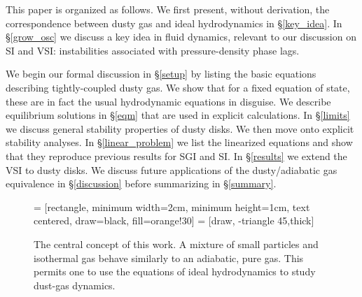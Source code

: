 \documentclass[iop, numberedappendix]{emulateapj}
\begin{document}
This paper is organized as follows. We first present, without
derivation, the correspondence between dusty gas and     
ideal hydrodynamics in \S\ref{key_idea}. In \S\ref{grow_osc} 
we discuss a key idea in fluid dynamics, relevant to our 
discussion on  SI and VSI: instabilities associated with
pressure-density phase lags.   

We begin our formal discussion in \S\ref{setup} by listing the 
basic equations describing tightly-coupled dusty gas. We show that for a
fixed equation of state, these are in 
fact the usual hydrodynamic equations in disguise. 
We describe equilibrium solutions in \S\ref{eqm} that are used in
explicit calculations. In \S\ref{limits} we discuss 
general stability properties of dusty disks. We then move onto
explicit stability analyses. In  
\S\ref{linear_problem} we list the linearized equations and show that 
they reproduce previous results for SGI and SI. In \S\ref{results} we
extend the VSI to dusty disks. We   
discuss future applications of the dusty/adiabatic gas equivalence in 
\S\ref{discussion} before summarizing in \S\ref{summary}. 


\begin{figure}
 = [rectangle, minimum width=2cm, minimum height=1cm, text centered, draw=black, fill=orange!30]
   = [draw, -triangle 45,thick]  
  \begin{center}
 \end{center}
\caption{The central concept of this work. A mixture of small particles
  and isothermal gas behave similarly to an adiabatic, pure gas. This
  permits one to use the equations of ideal hydrodynamics to study
  dust-gas dynamics. }
\end{figure}
\end{document}
